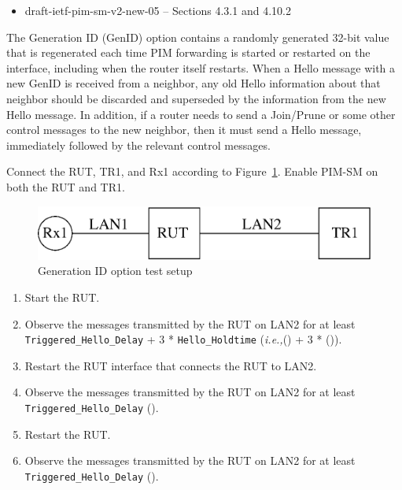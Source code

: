 \documentclass[11pt]{report}
\newcommand{\ie}{\emph{i.e.,}\xspace}
\begin{document}
\begin{itemize}
  \item draft-ietf-pim-sm-v2-new-05 -- Sections 4.3.1 and 4.10.2
\end{itemize}

The Generation ID (GenID) option contains a randomly generated 32-bit value
that is regenerated each time PIM forwarding is started or restarted on the
interface, including when the router itself restarts. When a Hello message
with a new GenID is received from a neighbor, any old Hello information about
that neighbor should be discarded and superseded by the information from the
new Hello message. In addition, if a router needs to send a Join/Prune or some
other control messages to the new neighbor, then it must send a Hello
message, immediately followed by the relevant control messages.

Connect the RUT, TR1, and Rx1 according to
Figure~\ref{fig:generation_id_option}.
Enable PIM-SM on both the RUT and TR1.

\begin{figure}[htbp]
  \begin{center}
    \includegraphics[scale=0.8]{figs/pim_test_2_6_generation_id_option}
    \caption{Generation ID option test setup}
    \label{fig:generation_id_option}
  \end{center}
\end{figure}



\begin{enumerate}

  \item Start the RUT.

  \item Observe the messages transmitted by the RUT on LAN2 for at least
        \verb=Triggered_Hello_Delay= + 3 * \verb=Hello_Holdtime=
        (\ie ({\PimsmTriggeredHelloDelay}) + 3 * ({\PimsmHelloHoldtime})).

  \item Restart the RUT interface that connects the RUT to LAN2.

  \item Observe the messages transmitted by the RUT on LAN2 for at least
        \verb=Triggered_Hello_Delay= ({\PimsmTriggeredHelloDelay}).

  \item Restart the RUT.

  \item Observe the messages transmitted by the RUT on LAN2 for at least
        \verb=Triggered_Hello_Delay= ({\PimsmTriggeredHelloDelay}).

\end{enumerate}
\end{document}
